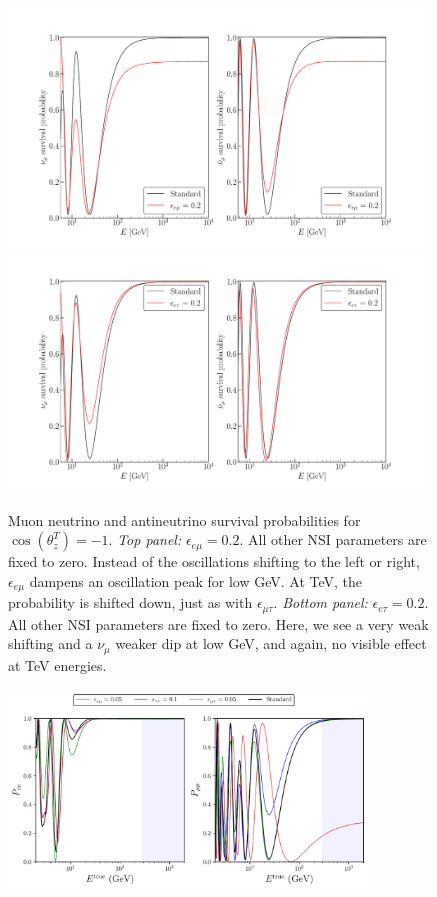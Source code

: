 \documentclass{article}
\newcommand{\ztrue}{\ensuremath{\cos{(\theta_z^{T})}}}
\newcommand{\emt}{\ensuremath{\epsilon_{\mu\tau}}}
\newcommand{\eet}{\epsilon_{e\tau}}
\newcommand{\eem}{\epsilon_{e\mu}}
\newcommand{\nm}{\nu_\mu}
\begin{document}
\begin{figure}
    \begin{center}
        \includegraphics[width=0.99\textwidth]{figures/eem_probs.pdf}
        \includegraphics[width=0.99\textwidth]{figures/eet_probs.pdf}
        \caption{Muon neutrino and antineutrino survival probabilities for
        $\ztrue = -1$. \emph{Top panel:} $\eem = 0.2$. All other NSI parameters are fixed to zero. Instead of the oscillations shifting to the left or right, $\eem$ dampens an oscillation peak for low \si{\GeV}. At \si{\TeV}, the probability is shifted down, just as with $\emt$.
        \emph{Bottom panel:} $\eet = 0.2$. All other NSI parameters are fixed to zero. Here, we see a very weak shifting and a $\nm$ weaker dip at low \si{\GeV}, and again, no visible effect at \si{TeV} energies. }
        \label{fig:eem_eet_probs}
    \end{center}
\end{figure}


\begin{figure}%
   \includegraphics[width=0.85\textwidth]{figures/probabilities.pdf}
   \caption{}\label{fig:nsi_probs}
\end{figure}
\end{document}

